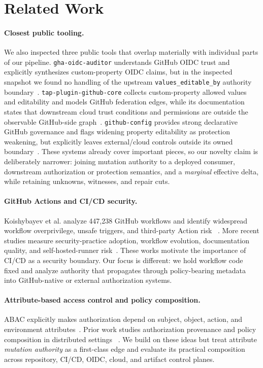 \documentclass[sigconf,review,anonymous]{acmart}
\begin{document}
\section{Related Work}

\paragraph{Closest public tooling.}
We also inspected three public tools that overlap materially with individual
parts of our pipeline.  \nolinkurl{gha-oidc-auditor} understands GitHub OIDC trust
and explicitly synthesizes custom-property OIDC claims, but in the inspected
snapshot we found no handling of the upstream
\nolinkurl{values_editable_by} authority boundary~\cite{gha-oidc-auditor}.
\nolinkurl{tap-plugin-github-core} collects custom-property allowed values and
editability and models GitHub federation edges, while its documentation states
that downstream cloud trust conditions and permissions are outside the
observable GitHub-side graph~\cite{tap-github-core}.  \nolinkurl{github-config}
provides strong declarative GitHub governance and flags widening property
editability as protection weakening, but explicitly leaves external/cloud
controls outside its owned boundary~\cite{mindclade-config}.  These systems
already cover important pieces, so our novelty claim is deliberately narrower:
joining mutation authority to a deployed consumer, downstream authorization or
protection semantics, and a \emph{marginal} effective delta, while retaining
unknowns, witnesses, and repair cuts.

\paragraph{GitHub Actions and CI/CD security.}
Koishybayev et al. analyze 447,238 GitHub workflows and identify widespread
workflow overprivilege, unsafe triggers, and third-party Action risk
~\cite{koishybayev2022gha}.  More recent studies measure security-practice
adoption, workflow evolution, documentation quality, and self-hosted-runner
risk~\cite{kubo2026action,boschanski2026docs,shi2026shcrguard,rostami2026evolution}.
These works motivate the importance of CI/CD as a security boundary.  Our focus
is different: we hold workflow code fixed and analyze authority that propagates
through policy-bearing metadata into GitHub-native or external authorization
systems.

\paragraph{Attribute-based access control and policy composition.}
ABAC explicitly makes authorization depend on subject, object, action, and
environment attributes~\cite{hu2015abac}.  Prior work studies authorization
provenance and policy composition in distributed settings
~\cite{hu2010authprov,lin2009abaccomposition}.  We build on these ideas but treat
attribute \emph{mutation authority} as a first-class edge and evaluate its
practical composition across repository, CI/CD, OIDC, cloud, and artifact
control planes.
\end{document}

